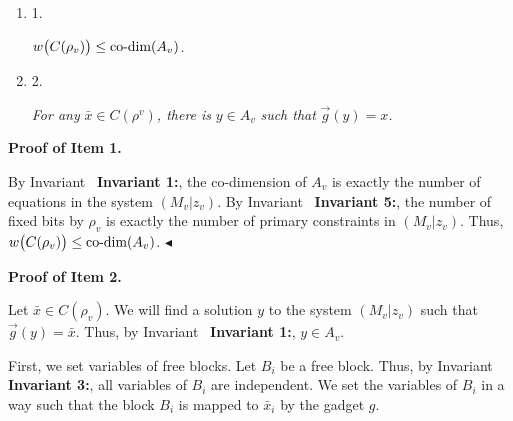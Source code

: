 \documentclass[10pt,a4paper]{article}
\begin{document}
\begin{enumerate}


\item[] 
1. 


$w\bigl{(}C(\rho_{v})\bigr{)}\leq\text{co-dim}(A_{v})$\emph{.}\par





\item[] 
2. 


\emph{For any }$\bar{x}\in C(\rho^{v})$\emph{, there is }$y\in A_{v}$\emph{ such that }$\overrightarrow{g}(y)=x$\emph{.}\par





\end{enumerate}






\par\medskip\noindent\textbf{Proof of Item 1.}\par




By Invariant \textbf{ Invariant 1:}, the co-dimension of $A_{v}$ is exactly the number of equations in the system $(M_{v}|z_{v})$.
By Invariant \textbf{ Invariant 5:}, the number of fixed bits by $\rho_{v}$ is exactly the number of primary constraints in $(M_{v}|z_{v})$.
Thus, $w\bigl{(}C(\rho_{v})\bigr{)}\leq\text{co-dim}(A_{v})$.
$\blacktriangleleft$\par





\par\medskip\noindent\textbf{Proof of Item 2.}\par




Let $\bar{x}\in C(\rho_{v})$.
We will find a solution $y$ to the system $(M_{v}|z_{v})$ such that $\overrightarrow{g}(y)=\bar{x}$.
Thus, by Invariant \textbf{ Invariant 1:}, $y\in A_{v}$.\par




First, we set variables of free blocks.
Let $B_{i}$ be a free block.
Thus, by Invariant \textbf{ Invariant 3:}, all variables of $B_{i}$ are independent.
We set the variables of $B_{i}$ in a way such that the block $B_{i}$ is mapped to $\bar{x}_{i}$ by the gadget $g$.\par
\end{document}
